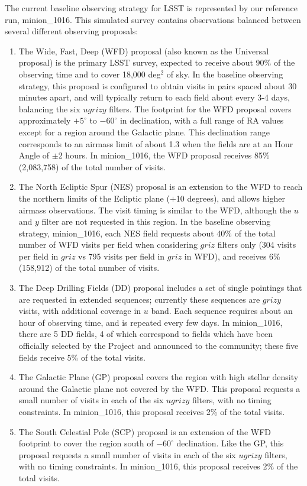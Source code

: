 The current baseline observing strategy for LSST is represented by our reference run, minion\_1016. This simulated survey 
contains observations balanced between several different observing proposals:
\begin{enumerate}
\item The Wide, Fast, Deep (WFD) proposal (also known as the Universal proposal) is the primary LSST survey, expected to receive about 90\% of the observing time and to cover 18,000 deg$^2$ of sky. In the baseline observing strategy, this proposal is configured to obtain visits in pairs spaced about 30 minutes apart, and will typically return to each field about every 3-4 days, balancing the six $ugrizy$ filters. The footprint for the WFD proposal covers approximately $+5^\circ$ to $-60^\circ$ in declination, with a full range of RA values except for a region around the Galactic plane. This declination range corresponds to an airmass limit of about 1.3 when the fields are at an Hour Angle of $\pm$2 hours. In minion\_1016, the WFD proposal receives 85\% (2,083,758) of the total number of visits.
\item The North Ecliptic Spur (NES) proposal is an extension to the WFD to reach the northern limits of the Ecliptic plane ($+$10 degrees), and allows higher airmass observations. The visit timing is similar to the WFD, although the $u$ and $y$ filter are not requested in this region. In the baseline observing strategy, minion\_1016, each NES field requests about 40\% of the total number of WFD visits per field when considering $griz$ filters only (304 visits per field in $griz$ vs 795 visits per field in $griz$ in WFD), and receives 6\% (158,912) of the total number of visits. 
\item The Deep Drilling Fields (DD) proposal includes a set of single pointings that are requested in extended sequences; currently these sequences are $grizy$ visits, with additional coverage in $u$ band. Each sequence requires about an hour of observing time, and is repeated every few days. In minion\_1016, there are 5 DD fields, 4 of which correspond to fields which have been officially selected 
by the Project and announced to the community; these five fields receive 5\% of the total visits. 
\item The Galactic Plane (GP) proposal covers the region with high stellar density around the Galactic plane not covered by the WFD. This proposal requests a small number of visits in each of the six $ugrizy$ filters, with no timing constraints. In minion\_1016, this proposal receives 2\% of the total visits. 
\item The South Celestial Pole (SCP) proposal is an extension of the WFD footprint to cover the region south of $-60^\circ$ declination. Like the GP, this proposal requests a small number of visits in each of the six $ugrizy$ filters, with no timing constraints. In minion\_1016, this proposal receives 2\% of the total visits.
\end{enumerate}

